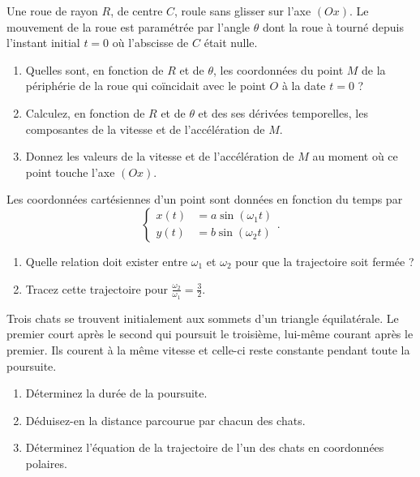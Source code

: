 %
\begin{exercice}
  Une roue de rayon $R$, de centre $C$, roule sans glisser sur l'axe $(Ox)$. Le mouvement de la roue est paramétrée par l'angle $\theta$ dont la roue à tourné depuis l'instant initial $t=0$ où l'abscisse de $C$ était nulle.
  \begin{enumerate}
  \item Quelles sont, en fonction de $R$ et de $\theta$, les coordonnées du point $M$ de la périphérie de la roue qui coïncidait avec le point $O$ à la date $t=0$ ?
  \item Calculez, en fonction de $R$ et de $\theta$ et des ses dérivées temporelles, les composantes de la vitesse et de l'accélération de $M$.
  \item Donnez les valeurs de la vitesse et de l'accélération de $M$ au moment où ce point touche l'axe $(Ox)$.
  \end{enumerate}
\end{exercice}
%
\begin{exercice}
  Les coordonnées cartésiennes d'un point sont données en fonction du temps par
  \begin{equation}
    \begin{cases}
      x(t) &= a\sin(\omega_1 t)\\
      y(t) &= b\sin(\omega_2 t)
    \end{cases}.
  \end{equation}
  \begin{enumerate}
  \item Quelle relation doit exister entre $\omega_1$ et $\omega_2$ pour que la trajectoire soit fermée ?
  \item Tracez cette trajectoire pour $\frac{\omega_2}{\omega_1}=\frac{3}{2}$.
  \end{enumerate}
\end{exercice}
%
\begin{exercice}
  Trois chats se trouvent initialement aux sommets d'un triangle équilatérale. Le premier court après le second qui poursuit le troisième, lui-même courant après le premier. Ils courent à la même vitesse et celle-ci reste constante pendant toute la poursuite.
  \begin{enumerate}
  \item Déterminez la durée de la poursuite.
  \item Déduisez-en la distance parcourue par chacun des chats.
  \item Déterminez l'équation de la trajectoire de l'un des chats en coordonnées polaires.
  \end{enumerate}
\end{exercice}
